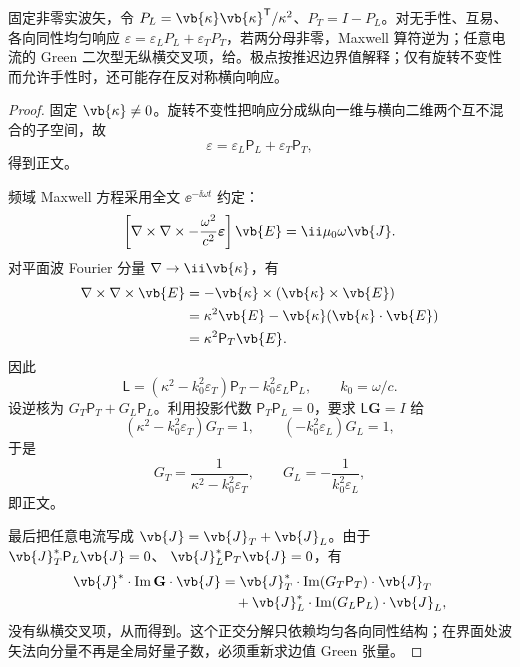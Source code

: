 \begin{proposition}
固定非零实波矢，令 $P_L=\vb{\kappa}\vb{\kappa}^{\mathsf T}/\kappa^2$、$P_T=I-P_L$。对无手性、互易、各向同性均匀响应 $\varepsilon=\varepsilon_LP_L+\varepsilon_TP_T$，若两分母非零，Maxwell 算符逆为；任意电流的 Green 二次型无纵横交叉项，给。极点按推迟边界值解释；仅有旋转不变性而允许手性时，还可能存在反对称横向响应。
\end{proposition}
\begin{proof}
固定 $\vb{\kappa}\neq0$。旋转不变性把响应分成纵向一维与横向二维两个互不混合的子空间，故
\[
\varepsilon
=\varepsilon_L\mathsf P_L+\varepsilon_T\mathsf P_T,
\]
得到正文。

频域 Maxwell 方程采用全文 $\ee^{-\ii\omega t}$ 约定：
\[
\left[
\nabla\times\nabla\times
-\frac{\omega^2}{c^2}\boldsymbol\varepsilon
\right]\vb{E}
=\ii\mu_0\omega\vb{J}.
\]
对平面波 Fourier 分量 $\nabla\to\ii\vb{\kappa}$，有
\begin{align*}
\nabla\times\nabla\times\vb{E}
&=-\vb{\kappa}\times
(\vb{\kappa}\times\vb{E})\\
&=\kappa^2\vb{E}
-\vb{\kappa}(\vb{\kappa}\cdot\vb{E})\\
&=\kappa^2\mathsf P_T\vb{E}.
\end{align*}
因此
\[
\mathsf L
=\left(\kappa^2-k_0^2\varepsilon_T\right)\mathsf P_T
-k_0^2\varepsilon_L\mathsf P_L,
\qquad k_0=\omega/c.
\]
设逆核为 $G_T\mathsf P_T+G_L\mathsf P_L$。利用投影代数
$\mathsf P_T\mathsf P_L=0$，要求 $\mathsf L\mathbf G=I$ 给
\[
(\kappa^2-k_0^2\varepsilon_T)G_T=1,
\qquad
(-k_0^2\varepsilon_L)G_L=1,
\]
于是
\[
G_T=\frac1{\kappa^2-k_0^2\varepsilon_T},
\qquad
G_L=-\frac1{k_0^2\varepsilon_L},
\]
即正文。

最后把任意电流写成
$\vb{J}=\vb{J}_T+\vb{J}_L$。由于
$\vb{J}_T^*\mathsf P_L\vb{J}=0$、
$\vb{J}_L^*\mathsf P_T\vb{J}=0$，有
\begin{align*}
\vb{J}^*\cdot\operatorname{Im}\mathbf G\cdot\vb{J}
&=\vb{J}_T^*\cdot
\operatorname{Im}(G_T\mathsf P_T)\cdot\vb{J}_T\\
&\quad+\vb{J}_L^*\cdot
\operatorname{Im}(G_L\mathsf P_L)\cdot\vb{J}_L,
\end{align*}
没有纵横交叉项，从而得到。这个正交分解只依赖均匀各向同性结构；在界面处波矢法向分量不再是全局好量子数，必须重新求边值 Green 张量。
\end{proof}


